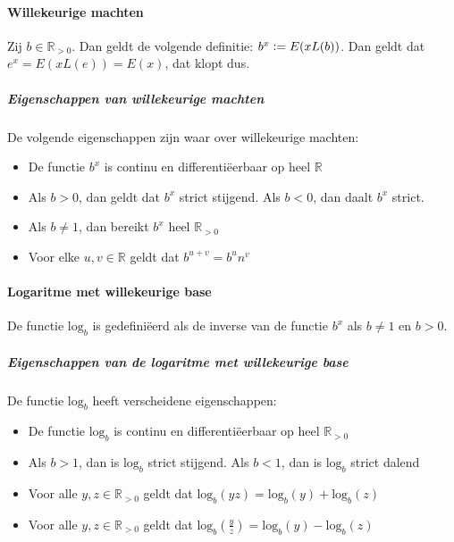 \paragraph{Willekeurige machten} Zij $b\in\mathbb{R}_{>0}$. Dan geldt de volgende definitie: $b^{x}\vcentcolon= E(xL(b))$. Dan geldt dat $e^{x}=E(xL(e))=E(x)$, dat klopt dus.

\subparagraph{Eigenschappen van willekeurige machten} De volgende eigenschappen zijn waar over willekeurige machten:

\begin{itemize}
  \setlength\itemsep{0em}
  \item De functie $b^{x}$ is continu en differentiëerbaar op heel $\mathbb{R}$
  \item Als $b>0$, dan geldt dat $b^{x}$ strict stijgend. Als $b<0$, dan daalt $b^{x}$ strict.
  \item Als $b\neq1$, dan bereikt $b^{x}$ heel $\mathbb{R}_{>0}$
  \item Voor elke $u,v\in\mathbb{R}$ geldt dat $b^{u+v}=b^{u}n^{v}$
\end{itemize}

\paragraph{Logaritme met willekeurige base} De functie $\text{log}_{b}$ is gedefiniëerd als de inverse van de functie $b^{x}$ als $b\neq1$ en $b>0$.

\subparagraph{Eigenschappen van de logaritme met willekeurige base} De functie $\text{log}_{b}$ heeft verscheidene eigenschappen:

\begin{itemize}
  \setlength\itemsep{0em}
  \item De functie $\text{log}_{b}$ is continu en differentiëerbaar op heel $\mathbb{R}_{>0}$
  \item Als $b>1$, dan is $\text{log}_{b}$ strict stijgend. Als $b<1$, dan is $\text{log}_{b}$ strict dalend
  \item Voor alle $y,z\in\mathbb{R}_{>0}$ geldt dat $\text{log}_{b}(yz)=\text{log}_{b}(y)+\text{log}_{b}(z)$
  \item Voor alle $y,z\in\mathbb{R}_{>0}$ geldt dat $\text{log}_{b}(\frac{y}{z})=\text{log}_{b}(y)-\text{log}_{b}(z)$
\end{itemize}
